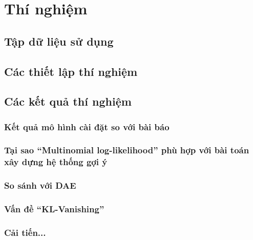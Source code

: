 \chapter{Thí nghiệm}
\label{Chapter4}

\section{Tập dữ liệu sử dụng}

\section{Các thiết lập thí nghiệm}
\section{Các kết quả thí nghiệm}
    \subsection{Kết quả mô hình cài đặt so với bài báo}
    \subsection{Tại sao ``Multinomial log-likelihood'' phù hợp với bài toán xây dựng hệ thống gợi ý}
    \subsection{So sánh với DAE}
    \subsection{Vấn đề ``KL-Vanishing''}
    \subsection{Cải tiến...}